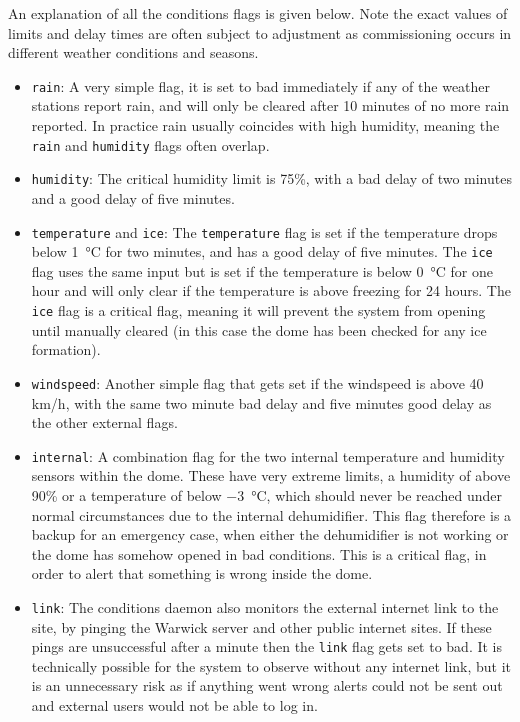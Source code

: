 \begin{colsection}
\begin{colsection}
An explanation of all the conditions flags is given below. Note the exact values of limits and delay times are often subject to adjustment as commissioning occurs in different weather conditions and seasons.

\begin{itemize}
\item \texttt{rain}: A very simple flag, it is set to bad immediately if any of the weather stations report rain, and will only be cleared after 10 minutes of no more rain reported. In practice rain usually coincides with high humidity, meaning the \texttt{rain} and \texttt{humidity} flags often overlap.

\item \texttt{humidity}: The critical humidity limit is 75\%, with a bad delay of two minutes and a good delay of five minutes.

\item \texttt{temperature} and \texttt{ice}: The \texttt{temperature} flag is set if the temperature drops below \SI{1}{\celsius} for two minutes, and has a good delay of five minutes. The \texttt{ice} flag uses the same input but is set if the temperature is below \SI{0}{\celsius} for one hour and will only clear if the temperature is above freezing for 24 hours. The \texttt{ice} flag is a critical flag, meaning it will prevent the system from opening until manually cleared (in this case the dome has been checked for any ice formation).

\item \texttt{windspeed}: Another simple flag that gets set if the windspeed is above 40 km/h, with the same two minute bad delay and five minutes good delay as the other external flags.

\item \texttt{internal}: A combination flag for the two internal temperature and humidity sensors within the dome. These have very extreme limits, a humidity of above 90\% or a temperature of below \SI{-3}{\celsius}, which should never be reached under normal circumstances due to the internal dehumidifier. This flag therefore is a backup for an emergency case, when either the dehumidifier is not working or the dome has somehow opened in bad conditions. This is a critical flag, in order to alert that something is wrong inside the dome.

\item \texttt{link}: The conditions daemon also monitors the external internet link to the site, by pinging the Warwick server and other public internet sites. If these pings are unsuccessful after a minute then the \texttt{link} flag gets set to bad. It is technically possible for the system to observe without any internet link, but it is an unnecessary risk as if anything went wrong alerts could not be sent out and external users would not be able to log in.


\end{itemize}
\end{colsection}
\end{colsection}
